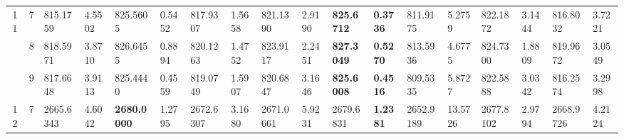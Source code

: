 \documentclass[conference]{IEEEtran}
\begin{document}
\begin{table*}[]
\begin{tabular}{|cc|ll|ll|ll|ll|ll|ll|ll|ll|}
		\multicolumn{1}{|c|}{\multirow{3}{*}{11}}         & 7                               & \multicolumn{1}{l|}{815.1759}          & 4.5502                            & \multicolumn{1}{l|}{825.5605}           & 0.5452                            & \multicolumn{1}{l|}{817.9307}          & 1.5658                            & \multicolumn{1}{l|}{821.1390}          & 2.9190                            & \multicolumn{1}{l|}{\textbf{825.6712}}  & \textbf{0.3736}                   & \multicolumn{1}{l|}{811.9175}          & 5.2759                            & \multicolumn{1}{l|}{822.1872}          & 3.1444                            & \multicolumn{1}{l|}{816.8032}          & 3.7221                            \\ \cline{2-18} 
		\multicolumn{1}{|c|}{}                            & 8                               & \multicolumn{1}{l|}{818.5971}          & 3.8710                            & \multicolumn{1}{l|}{826.6455}           & 0.8894                            & \multicolumn{1}{l|}{820.1263}          & 1.4752                            & \multicolumn{1}{l|}{823.9117}          & 2.2451                            & \multicolumn{1}{l|}{\textbf{827.3049}}  & \textbf{0.5270}                   & \multicolumn{1}{l|}{813.5936}          & 4.6775                            & \multicolumn{1}{l|}{824.7300}          & 1.8809                            & \multicolumn{1}{l|}{819.9672}          & 3.0549                            \\ \cline{2-18} 
		\multicolumn{1}{|c|}{}                            & 9                               & \multicolumn{1}{l|}{817.6648}          & 3.9113                            & \multicolumn{1}{l|}{825.4440}           & 0.4559                            & \multicolumn{1}{l|}{819.0749}          & 1.5907                            & \multicolumn{1}{l|}{820.6847}          & 3.1646                            & \multicolumn{1}{l|}{\textbf{825.6008}}  & \textbf{0.4516}                   & \multicolumn{1}{l|}{809.5335}          & 5.8727                            & \multicolumn{1}{l|}{822.5888}          & 3.0342                            & \multicolumn{1}{l|}{816.2574}          & 3.2998                            \\ \hline
		\multicolumn{1}{|c|}{\multirow{3}{*}{12}}         & 7                               & \multicolumn{1}{l|}{2665.6343}         & 4.6042                            & \multicolumn{1}{l|}{\textbf{2680.0000}} & 1.2795                            & \multicolumn{1}{l|}{2672.6307}         & 3.1680                            & \multicolumn{1}{l|}{2671.0661}         & 5.9231                            & \multicolumn{1}{l|}{2679.6831}          & \textbf{1.2381}                   & \multicolumn{1}{l|}{2652.9189}         & 13.5726                           & \multicolumn{1}{l|}{2677.8102}         & 2.9794                            & \multicolumn{1}{l|}{2668.9726}         & 4.2124                            \\ \cline{2-18} 

\end{tabular}
\end{table*}
\end{document}
